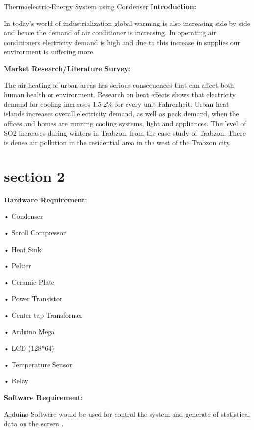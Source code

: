 \documentclass[12pt]{beamer}
\begin{document}
\begin{frame}{Thermoelectric-Energy System using Condenser} 
\textbf{Introduction:         }

In today's world of industrialization global warming is also increasing side by side and hence the demand of air conditioner is increasing. In operating air conditioners electricity demand is high and due to this increase in supplies our environment is suffering more. 

\textbf{Market Research/Literature Survey:         }

The air heating of urban areas has serious consequences that can affect both human health or environment. Research on heat effects shows that electricity demand for cooling increases 1.5-2\% for every unit Fahrenheit. Urban heat islands increases overall electricity demand, as well as peak demand, when the offices and homes are running cooling systems, light and appliances.
The level of SO2 increases during winters in Trabzon, from the case study of Trabzon. There is dense air pollution in the residential area in the west of the Trabzon city. 

\end{frame}

\section{section 2}
\begin{frame}
\textbf{Hardware Requirement:         }

•	Condenser  

•	Scroll Compressor 

•	Heat Sink  

•	Peltier 

•	Ceramic Plate  

•	Power Transistor 

•	Center tap Transformer  

•	Arduino Mega  

•	LCD  (128*64) 

•	Temperature Sensor  

•	Relay 


\textbf{Software Requirement:         }

Arduino Software would be used for control the system and generate of statistical data on the screen . 


\end{frame}
\end{document}
